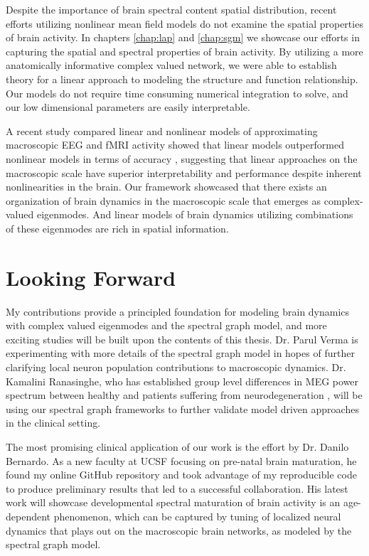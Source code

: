 Despite the importance of brain spectral content spatial distribution, recent efforts utilizing nonlinear mean field models do not examine the spatial properties of brain activity. In chapters \ref{chap:lap} and \ref{chap:sgm} we showcase our efforts in capturing the spatial and spectral properties of brain activity. By utilizing a more anatomically informative complex valued network, we were able to establish theory for a linear approach to modeling the structure and function relationship. Our models do not require time consuming numerical integration to solve, and our low dimensional parameters are easily interpretable. 

A recent study compared linear and nonlinear models of approximating macroscopic EEG and fMRI activity showed that linear models outperformed nonlinear models in terms of accuracy \cite{nozari_is_2020}, suggesting that linear approaches on the macroscopic scale have superior interpretability and performance despite inherent nonlinearities in the brain. Our framework showcased that there exists an organization of brain dynamics in the macroscopic scale that emerges as complex-valued eigenmodes. And linear models of brain dynamics utilizing combinations of these eigenmodes are rich in spatial information.

\section{Looking Forward}
My contributions provide a principled foundation for modeling brain dynamics with complex valued eigenmodes and the spectral graph model, and more exciting studies will be built upon the contents of this thesis. Dr. Parul Verma is experimenting with more details of the spectral graph model in hopes of further clarifying local neuron population contributions to macroscopic dynamics. Dr. Kamalini Ranasinghe, who has established group level differences in MEG power spectrum between healthy and patients suffering from neurodegeneration \cite{Ranasinghe2014}, will be using our spectral graph frameworks to further validate model driven approaches in the clinical setting. 

The most promising clinical application of our work is the effort by Dr. Danilo Bernardo. As a new faculty at UCSF focusing on pre-natal brain maturation, he found my online GitHub repository and took advantage of my reproducible code to produce preliminary results that led to a successful collaboration. His latest work will showcase developmental spectral maturation of brain activity is an age-dependent phenomenon, which can be captured by tuning of localized neural dynamics that plays out on the macroscopic brain networks, as modeled by the spectral graph model.

